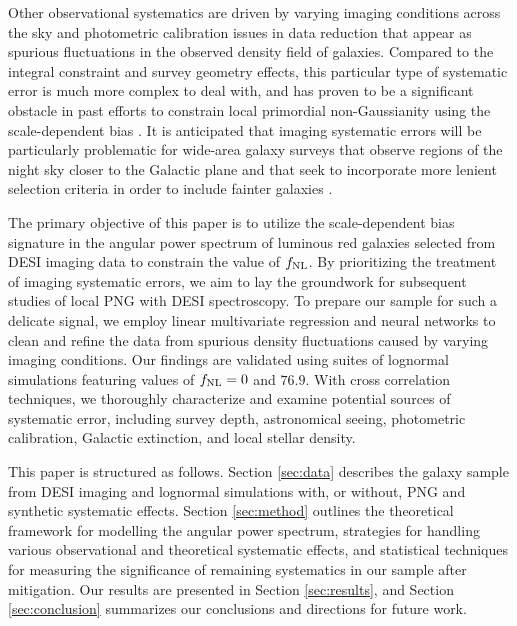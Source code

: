  Other observational systematics are driven by varying imaging conditions across the sky \citep{ross2011} and photometric calibration issues in data reduction \citep{huterer2013calibration} that appear as spurious fluctuations in the observed density field of galaxies. Compared to the integral constraint and survey geometry effects, this particular type of systematic error is much more complex to deal with, and has proven to be a significant obstacle in past efforts to constrain local primordial non-Gaussianity using the scale-dependent bias \citep[see, e.g.,][]{pullen2013systematic, Ho2015JCAP...05..040H}. It is anticipated that imaging systematic errors will be particularly problematic for wide-area galaxy surveys that observe regions of the night sky closer to the Galactic plane and that seek to incorporate more lenient selection criteria in order to include fainter galaxies \citep[see, e.g,][]{kitanidis2020imaging}. 

The primary objective of this paper is to utilize the scale-dependent bias signature in the angular power spectrum of luminous red galaxies selected from DESI imaging data to constrain the value of $f_{\rm NL}$. By prioritizing the treatment of imaging systematic errors, we aim to lay the groundwork for subsequent studies of local PNG with DESI spectroscopy. To prepare our sample for such a delicate signal, we employ linear multivariate regression and neural networks to clean and refine the data from spurious density fluctuations caused by varying imaging conditions. Our findings are validated using suites of lognormal simulations featuring values of $f_{\rm NL}=0$ and $76.9$. With cross correlation techniques, we thoroughly characterize and examine potential sources of systematic error, including survey depth, astronomical seeing, photometric calibration, Galactic extinction, and local stellar density.

This paper is structured as follows. Section \ref{sec:data} describes the galaxy sample from DESI imaging and lognormal simulations with, or without, PNG and synthetic systematic effects. Section \ref{sec:method} outlines the theoretical framework for modelling the angular power spectrum, strategies for handling various observational and theoretical systematic effects, and statistical techniques for measuring the significance of remaining systematics in our sample after mitigation. Our results are presented in Section \ref{sec:results}, and Section \ref{sec:conclusion} summarizes our conclusions and directions for future work.